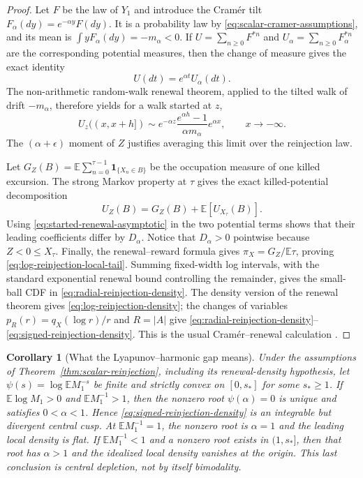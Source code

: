 \documentclass[11pt]{article}
\newtheorem{corollary}[theorem]{Corollary}
\theoremstyle{definition}
\newcommand{\E}{\mathbb E}
\newcommand{\ind}{\mathbf 1}
\begin{document}
\begin{proof}
Let $F$ be the law of $Y_1$ and introduce the Cram\'er tilt
$F_\alpha(dy)=e^{-\alpha y}F(dy)$.  It is a probability law by
\eqref{eq:scalar-cramer-assumptions}, and its mean is
$\int yF_\alpha(dy)=-m_\alpha<0$.  If
$U=\sum_{n\geq0}F^{*n}$ and
$U_\alpha=\sum_{n\geq0}F_\alpha^{*n}$ are the corresponding potential
measures, then the change of measure gives the exact identity
\begin{equation}
 U(dt)=e^{\alpha t}U_\alpha(dt).
 \label{eq:renewal-tilt-identity}
\end{equation}
The non-arithmetic random-walk renewal theorem, applied to the tilted walk
of drift $-m_\alpha$, therefore yields for a walk started at $z$,
\begin{equation}
 U_z((x,x+h])
 \sim e^{-\alpha z}
 \frac{e^{\alpha h}-1}{\alpha m_\alpha}e^{\alpha x},
 \qquad x\to-\infty.
 \label{eq:started-renewal-asymptotic}
\end{equation}
The $(\alpha+\epsilon)$ moment of $Z$ justifies averaging this limit over
the reinjection law.

Let
$G_Z(B)=\E\sum_{n=0}^{\tau-1}\ind_{\{X_n\in B\}}$ be the occupation
measure of one killed excursion.  The strong Markov property at $\tau$
gives the exact killed-potential decomposition
\begin{equation}
 U_Z(B)=G_Z(B)+\E[U_{X_\tau}(B)].
 \label{eq:killed-potential-identity}
\end{equation}
Using \eqref{eq:started-renewal-asymptotic} in the two potential terms
shows that their leading coefficients differ by $D_\alpha$.  Notice that
$D_\alpha>0$ pointwise because $Z<0\leq X_\tau$.  Finally, the
renewal--reward formula gives $\pi_X=G_Z/\E\tau$, proving
\eqref{eq:log-reinjection-local-tail}.  Summing fixed-width log intervals,
with the standard exponential renewal bound controlling the remainder,
gives the small-ball CDF in \eqref{eq:radial-reinjection-density}.  The
density version of the renewal theorem gives
\eqref{eq:log-reinjection-density}; the changes of variables
$p_R(r)=q_X(\log r)/r$ and $R=|A|$ give
\eqref{eq:radial-reinjection-density}--\eqref{eq:signed-reinjection-density}.
This is the usual Cram\'er--renewal calculation
\cite{Asmussen2003,Alsmeyer1994}.
\end{proof}

\begin{corollary}[What the Lyapunov--harmonic gap means]
\label{cor:scalar-reinjection-order}
Under the assumptions of Theorem~\ref{thm:scalar-reinjection}, including its
renewal-density hypothesis, let
$\psi(s)=\log\E M_1^{-s}$ be finite and strictly convex on
$[0,s_*]$ for some $s_*\geq1$.
If $\E\log M_1>0$ and $\E M_1^{-1}>1$, then the nonzero root
$\psi(\alpha)=0$ is unique and satisfies $0<\alpha<1$.  Hence
\eqref{eq:signed-reinjection-density} is an integrable but divergent central
cusp.  At $\E M_1^{-1}=1$, the nonzero root is $\alpha=1$ and the leading
local density is flat.  If $\E M_1^{-1}<1$ and a nonzero root exists in
$(1,s_*]$, then that root has $\alpha>1$ and the idealized local density
vanishes at the origin.  This last conclusion is central depletion, not by
itself bimodality.
\end{corollary}
\end{document}
